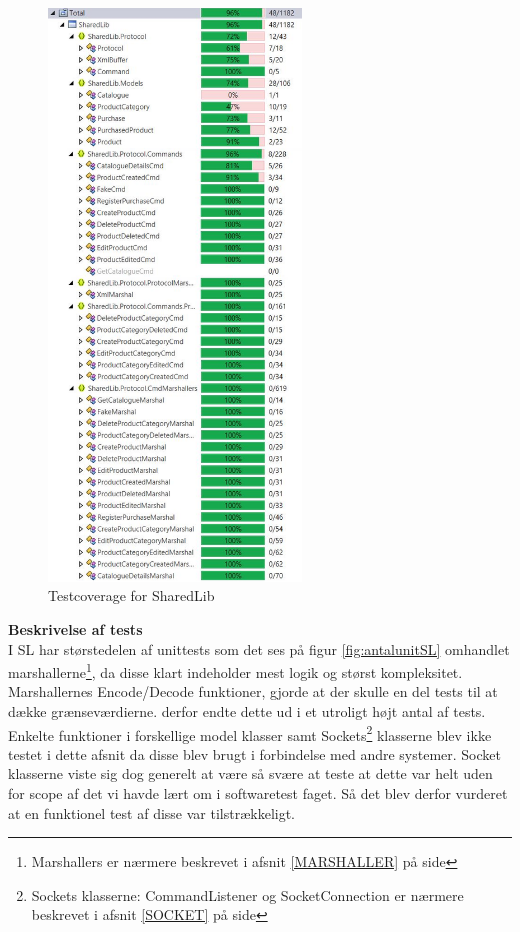 \begin{figure}[H]
	\centering
	\includegraphics[width=0.60\textwidth]{Test/SharedLib/UnitTests/UCoverUlt.png}
	\caption{Testcoverage for SharedLib}
	\label{fig:coverSL}
\end{figure}


\newpage
\textbf{Beskrivelse af tests}\\
I \gls{SL} har størstedelen af unittests som det ses på figur \ref{fig:antalunitSL} omhandlet marshallerne\footnote{Marshallers er nærmere beskrevet i afsnit \ref{MARSHALLER} på side \pageref{MARSHALLER}}, da disse klart indeholder mest logik og størst kompleksitet. Marshallernes Encode/Decode funktioner, gjorde at der skulle en del tests til at dække grænseværdierne. derfor endte dette ud i et utroligt højt antal af tests. Enkelte funktioner i forskellige model klasser samt Sockets\footnote{Sockets klasserne: CommandListener og SocketConnection er nærmere beskrevet i afsnit \ref{SOCKET} på side \pageref{SOCKET}} klasserne blev ikke testet i dette afsnit da disse blev brugt i forbindelse med andre systemer. Socket klasserne viste sig dog generelt at være så svære at teste at dette var helt uden for scope af det vi havde lært om i softwaretest faget. Så det blev derfor vurderet at en funktionel test af disse var tilstrækkeligt.